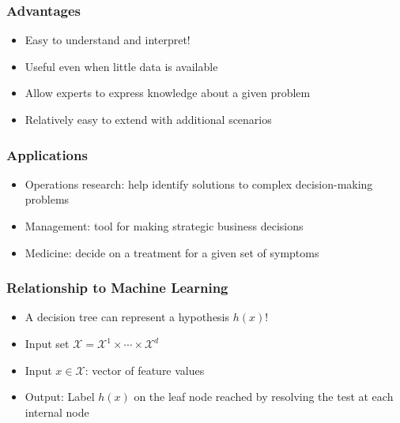 \documentclass[10pt]{beamer}
\begin{document}
\begin{frame}
  \frametitle{Advantages}
  \begin{itemize}
    \item Easy to understand and interpret!
	\item Useful even when little data is available
	\item Allow experts to express knowledge about a given problem
	\item Relatively easy to extend with additional scenarios
  \end{itemize}
\end{frame}

\begin{frame}
  \frametitle{Applications}
  \begin{itemize}
    \item {\color{red} Operations research}: help identify solutions to complex decision-making problems
    \item {\color{blue} Management}: tool for making strategic business decisions
	\item {\color{green} Medicine}: decide on a treatment for a given set of symptoms
  \end{itemize}
\end{frame}

\begin{frame}
  \frametitle{Relationship to Machine Learning}
  \begin{itemize}
	\item A decision tree can represent a hypothesis $h(x)$!
	\item {\color{red} Input set} $\mathcal{X} = \mathcal{X}^1\times\cdots\times\mathcal{X}^d$
    \item {\color{blue} Input} $x\in \mathcal{X}$: vector of feature values
	\item {\color{green} Output}: Label $h(x)$ on the leaf node reached by resolving the
		test at each internal node
  \end{itemize}
\end{frame}
\end{document}
